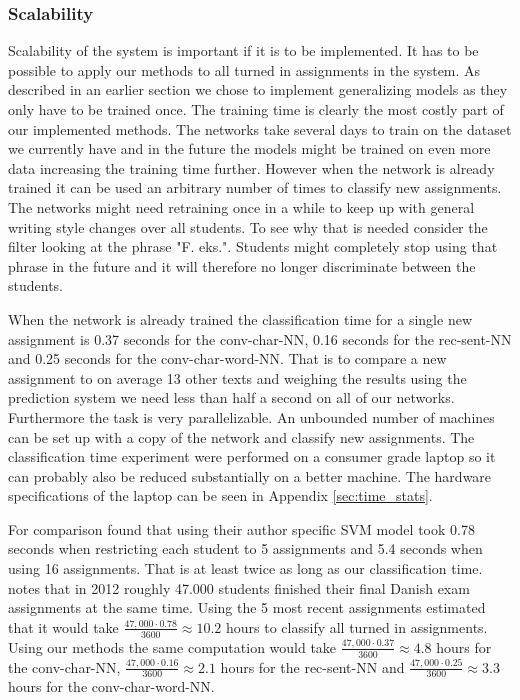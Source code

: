 \subsubsection{Scalability}

Scalability of the system is important if it is to be implemented. It has to be
possible to apply our methods to all turned in assignments in the system. As
described in an earlier section we chose to implement generalizing models as
they only have to be trained once. The training time is clearly the most costly
part of our implemented methods. The networks take several days to train on
the dataset we currently have and in the future the models might be trained on
even more data increasing the training time further. However when the network
is already trained it can be used an arbitrary number of times to classify
new assignments. The networks might need retraining once in a while to keep
up with general writing style changes over all students. To see why that is
needed consider the filter looking at the phrase "F. eks.". Students might
completely stop using that phrase in the future and it will therefore no longer
discriminate between the students.

When the network is already trained the classification time for a single new
assignment is 0.37 seconds for the \gls{conv-char-NN}, 0.16 seconds for the
\gls{rec-sent-NN} and 0.25 seconds for the \gls{conv-char-word-NN}. That is to
compare a new assignment to on average 13 other texts and weighing the results
using the prediction system we need less than half a second on all of our
networks. Furthermore the task is very parallelizable. An unbounded number of
machines can be set up with a copy of the network and classify new assignments.
The classification time experiment were performed on a consumer grade laptop so
it can probably also be reduced substantially on a better machine. The hardware
specifications of the laptop can be seen in Appendix \ref{sec:time_stats}.

For comparison \citet{hansen2014} found that using their author specific
\gls{SVM} model took 0.78 seconds when restricting each student to 5 assignments
and 5.4 seconds when using 16 assignments. That is at least twice as long as
our classification time. \citet{hansen2014} notes that in 2012 roughly 47.000
students finished their final Danish exam assignments at the same time. Using
the 5 most recent assignments \citet{hansen2014} estimated that it would take
$\frac{47,000 \cdot 0.78}{3600} \approx 10.2$ hours to classify all turned in
assignments. Using our methods the same computation would take $\frac{47,000
\cdot 0.37}{3600} \approx 4.8$ hours for the \gls{conv-char-NN}, $\frac{47,000
\cdot 0.16}{3600} \approx 2.1$ hours for the \gls{rec-sent-NN} and $\frac{47,000
\cdot 0.25}{3600} \approx 3.3$ hours for the \gls{conv-char-word-NN}.

